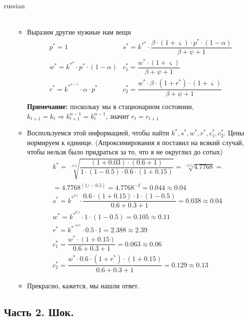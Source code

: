 \documentclass[fleqn]{article}
\begin{document}
\begin{otherlanguage*}{russian}
\begin{enumerate}[label=\alph*), leftmargin=*]
\begin{itemize}
\begin{align*}
{}
\end{align*}
\item Выразим другие нужные нам вещи
\begin{align*}
&p^* = 1 
&s^* = k^{*^\alpha} \cdot \dfrac{\beta \cdot (1 + \varsigma )  \cdot p^* \cdot (1 - \alpha)}{\beta + \psi + 1 } \\
&w^* = k^{*^\alpha}  \cdot p^* \cdot (1 - \alpha) 
&c_{1}^* = \dfrac{w^* \cdot (1 + \varsigma ) }{\beta + \psi + 1} \\
&r^* = k^{*^{\alpha - 1}} \cdot \alpha \cdot p^* 
&c_{2}^* = \dfrac{w^* \cdot \beta \cdot (1 + r^*) \cdot (1 + \varsigma ) }{\beta + \psi + 1}  \\
\end{align*}
\textbf{Примечание:} поскольку мы в стационарном состоянии, $ k_{t+1} = k_t \Rightarrow k^{\alpha - 1}_{t+1} = k_t^{\alpha - 1} $, значит $ r_t = r_{t+1} $ 
\item Воспользуемся этой информацией, чтобы найти $ k^* , s^*, w^*, r^*, c_1^*, c_2^* $. Цены нормируем к единице. (Апроксимирования я поставил на всякий случай, чтобы нельзя было придраться за то, что я не округлил до сотых)
\begin{align*}
k^* = \sqrt[-0.5]{
\dfrac{(1 + 0.03) \cdot ( 0.6 + 1) }{1 \cdot (1 - 0.5) \cdot 0.6 \cdot (1 + 0.15 )}
} = \sqrt[-0.5]{4.7768} = \\
=  4.7768^{(1 / -0.5)} = 4.7768^{-2} = 0.044 \approx 0.04
\\
s^* = k^{*^{0.5}} \cdot \dfrac{0.6 \cdot (1 + 0.15) \cdot 1 \cdot (1 - 0.5) }{0.6 + 0.3 + 1}= 0.038 \approx 0.04
\\
w^* = k^{*^{0.5}} \cdot 1 \cdot (1 - 0.5 ) = 0.105 \approx 0.11
\\
r^* = k^{*^{- 0.5}} \cdot 0.5 \cdot 1 = 2.388 \approx 2.39
\\
c_1^* =\dfrac{w^* \cdot (1 + 0.15)}{0.6 + 0.3 + 1} = 0.063 \approx 0.06 \\
c_2^* = \dfrac{w^* \cdot 0.6 \cdot (1 + r^*) \cdot (1 + 0.15)}{0.6 + 0.3 + 1} = 0.129 \approx 0.13
\end{align*}
\item Прекрасно, кажется, мы нашли ответ. 
\end{itemize}
\end{enumerate}
\subsection*{Часть 2. Шок. }

\end{otherlanguage*}
\end{document}
